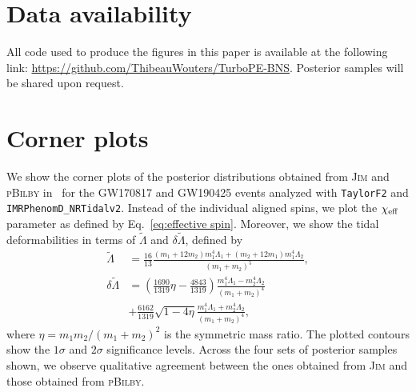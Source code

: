 \documentclass[prd,twocolumn,a4paper,floatfix,nofootinbib,preprintnumbers,superscriptaddress]{revtex4-1}
\begin{document}
\appendix 
\FloatBarrier

\section{Data availability}

All code used to produce the figures in this paper is available at the following link: \url{https://github.com/ThibeauWouters/TurboPE-BNS}. Posterior samples will be shared upon request.

\section{Corner plots}
\label{sec:corner_plot}
We show the corner plots of the posterior distributions obtained from \textsc{Jim} and \textsc{pBilby} in~ for the GW170817 and GW190425 events analyzed with \texttt{TaylorF2} and \texttt{IMRPhenomD\_NRTidalv2}. Instead of the individual aligned spins, we plot the $\chi_{\rm{eff}}$ parameter as defined by Eq.~\eqref{eq:effective spin}. 
Moreover, we show the tidal deformabilities in terms of $\tilde{\Lambda}$ and $\delta\tilde{\Lambda}$, defined by
\begin{equation}
\begin{aligned}
\tilde{\Lambda} &= \frac{16}{13}\frac{(m_1 + 12 m_2)m_1^4\Lambda_1 + (m_2 + 12 m_1)m_1^4\Lambda_2}{(m_1+m_2)^5},\\
\delta\tilde{\Lambda} &= \left(\frac{1690}{1319}\eta - \frac{4843}{1319}\right)\frac{m_1^4\Lambda_1 - m_2^4\Lambda_2}{{(m_1+m_2)^4}}\\
&+\frac{6162}{1319}\sqrt{1 - 4\eta}\frac{m_1^4\Lambda_1 + m_2^4\Lambda_2}{{(m_1+m_2)^4}},
\end{aligned}
\end{equation}
where $\eta=m_1m_2/(m_1 + m_2)^2$ is the symmetric mass ratio. The plotted contours show the $1\sigma$ and $2\sigma$ significance levels. Across the four sets of posterior samples shown, we observe qualitative agreement between the ones obtained from \textsc{Jim} and those obtained from \textsc{pBilby}.
\end{document}
